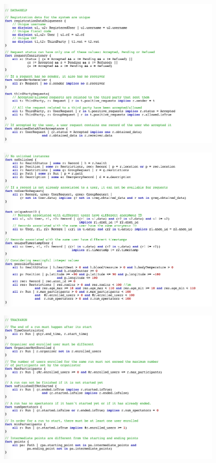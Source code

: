 \begin{figure}[H]
    \centering
    \includegraphics[scale=0.6]{rasdL/Pictures/alloy/model4.png}
\end{figure}
\begin{figure}[H]
    \centering
    \includegraphics[scale=0.6]{rasdL/Pictures/alloy/model5.png}
\end{figure}
\begin{figure}[H]
    \centering
    \includegraphics[scale=0.6]{rasdL/Pictures/alloy/model6.png}
\end{figure}
